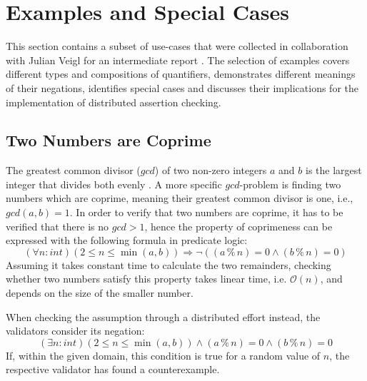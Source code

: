 \section{Examples and Special Cases}\label{sec:examples}
This section contains a subset of use-cases that were collected in collaboration with Julian Veigl for an intermediate report \cite{bernhardt_veigel_2020}. The selection of examples covers different types and compositions of quantifiers, demonstrates different meanings of their negations, identifies special cases and discusses their implications for the implementation of distributed assertion checking.

\subsection{Two Numbers are Coprime}\label{sec:coprime}
The greatest common divisor ($gcd$) of two non-zero integers $a$ and $b$ is the largest integer that divides both evenly \cite{hardy2008introduction}. A more specific $gcd$-problem is finding two numbers which are coprime, meaning their greatest common divisor is one, i.e., $gcd(a, b) = 1$. In order to verify that two numbers are coprime, it has to be verified that there is no $gcd > 1$, hence the property of coprimeness can be expressed with the following formula in predicate logic:
\begin{equation}\label{eq:coprime-universial}
    (\forall n : int) (2 \le n \le \min(a,b)) \Rightarrow \neg((a \mathbin{\%} n) = 0 \land (b \mathbin{\%} n) = 0)
\end{equation}
Assuming it takes constant time to calculate the two remainders, checking whether two numbers satisfy this property takes linear time, i.e. $\mathcal{O}(n)$, and depends on the size of the smaller number.

When checking the assumption through a distributed effort instead, the validators consider its negation:
\begin{equation}\label{eq:coprime-existential}
    (\exists n : int) (2 \le n \le \min(a,b)) \land (a \mathbin{\%} n) = 0 \land (b \mathbin{\%} n) = 0
\end{equation}
If, within the given domain, this condition is true for a random value of $n$, the respective validator has found a counterexample.

